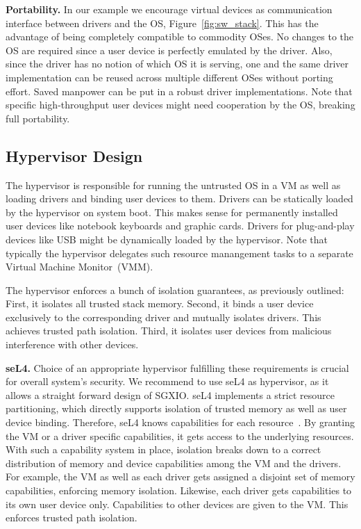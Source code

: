 \documentclass{sig-alternate-05-2015}
\begin{document}
\textbf{Portability.}
In our example we encourage virtual devices as communication interface between drivers and the OS, \cf Figure~\ref{fig:sw_stack}. 
This has the advantage of being completely compatible to commodity OSes. 
No changes to the OS are required since a user device is perfectly emulated by the driver. 
Also, since the driver has no notion of which OS it is serving, one and the same driver implementation can be reused across multiple different OSes without porting effort. 
Saved manpower can be put in a robust driver implementations. 
Note that specific high-throughput user devices might need cooperation by the OS, breaking full portability. 

\subsection{Hypervisor Design}

The hypervisor is responsible for running the untrusted OS in a VM as well as loading drivers and binding user devices to them. 
Drivers can be statically loaded by the hypervisor on system boot. 
This makes sense for permanently installed user devices like notebook keyboards and graphic cards. 
Drivers for plug-and-play devices like USB might be dynamically loaded by the hypervisor. 
Note that typically the hypervisor delegates such resource manangement tasks to a separate Virtual Machine Monitor~(VMM). 

The hypervisor enforces a bunch of isolation guarantees, as previously outlined: 
First, it isolates all trusted stack memory. 
Second, it binds a user device exclusively to the corresponding driver and mutually isolates drivers. 
This achieves trusted path isolation. 
Third, it isolates user devices from malicious interference with other devices. 

\textbf{seL4.}
Choice of an appropriate hypervisor fulfilling these requirements is crucial for overall system's security.
We recommend to use seL4 as hypervisor, as it allows a straight forward design of SGXIO. 
seL4 implements a strict resource partitioning, which directly supports isolation of trusted memory as well as user device binding. 
Therefore, seL4 knows capabilities for each resource~\cite{sel4manual2.0}. 
By granting the VM or a driver specific capabilities, it gets access to the underlying resources. 
With such a capability system in place, isolation breaks down to a correct distribution of memory and device capabilities among the VM and the drivers. 
For example, the VM as well as each driver gets assigned a disjoint set of memory capabilities, enforcing memory isolation. 
Likewise, each driver gets capabilities to its own user device only. 
Capabilities to other devices are given to the VM. 
This enforces trusted path isolation. 
\end{document}
